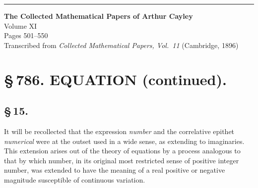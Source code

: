 \documentclass[11pt,a4paper]{book}
\begin{document}
\vspace{1cm}
\begin{center}
\rule{0.5\textwidth}{0.4pt}
\end{center}
\clearpage


\thispagestyle{empty}
\begin{center}
\Large\textbf{The Collected Mathematical Papers of Arthur Cayley}\\[6pt]
\large Volume XI\\[12pt]
\normalsize Pages 501--550\\[6pt]
\small Transcribed from \textit{Collected Mathematical Papers, Vol.~11} (Cambridge, 1896)
\end{center}
\vspace{2\baselineskip}

\section*[Article 786]{\S\,786. EQUATION (continued).}


\subsection*{\S\,15.}

It will be recollected that the expression \textit{number} and the correlative epithet \textit{numerical} were at the outset used in a wide sense, as extending to imaginaries. This extension arises out of the theory of equations by a process analogous to that by which number, in its original most restricted sense of positive integer number, was extended to have the meaning of a real positive or negative magnitude susceptible of continuous variation.
\end{document}
